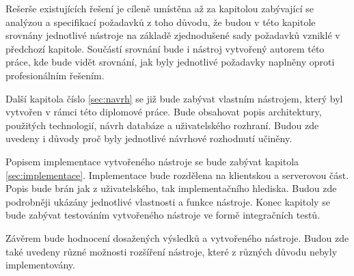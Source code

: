 Rešerše existujících řešení je cíleně umístěna až za kapitolou zabývající se analýzou a specifikací požadavků z toho důvodu, že budou v této kapitole srovnány jednotlivé nástroje na základě zjednodušené sady požadavků vzniklé v předchozí kapitole. Součástí srovnání bude i nástroj vytvořený autorem této práce, kde bude vidět srovnání, jak byly jednotlivé požadavky naplněny oproti profesionálním řešením. 

Další kapitola číslo \ref{sec:navrh} se již bude zabývat vlastním nástrojem, který byl vytvořen v rámci této diplomové práce. Bude obsahovat popis architektury, použitých technologií, návrh databáze a uživatelského rozhraní. Budou zde uvedeny i důvody proč byly jednotlivé návrhové rozhodnutí učiněny. 

Popisem implementace vytvořeného nástroje se bude zabývat kapitola \ref{sec:implementace}. Implementace bude rozdělena na klientskou a serverovou část. Popis bude brán jak z uživatelského, tak implementačního hlediska. Budou zde podrobněji ukázány jednotlivé vlastnosti a funkce nástroje. Konec kapitoly se bude zabývat testováním vytvořeného nástroje ve formě integračních testů. 

Závěrem bude hodnocení dosažených výsledků a vytvořeného nástroje. Budou zde také uvedeny různé možnosti rozšíření nástroje, které z různých důvodu nebyly implementovány. 
\endinput